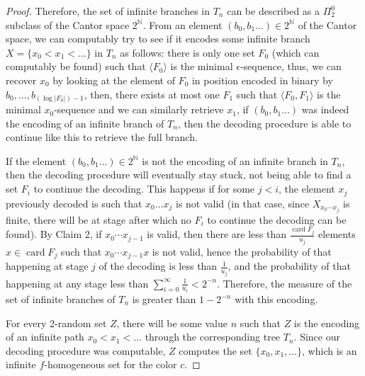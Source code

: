 \documentclass{article}
\numberwithin{theorem}{section}
\newcommand{\ludovic}[1]{\textcolor{blue}{#1}}
\newcommand{\quentin}[1]{\textcolor{green}{#1}}
\newcommand{\NN}[0]{\mathbb{N}}
\newcommand{\card}{\operatorname{card}}
\begin{document}
\begin{proof}
Therefore, the set of infinite branches in $T_n$ can be described as a $\Pi_2^0$ subclass of the Cantor space $2^{\NN}$. From an element $(b_0, b_1 \dots) \in 2^{\NN}$ of the Cantor space, we can computably try to see if it encodes some infinite branch $X = \{x_0 < x_1 < \dots \}$ in $T_n$ as follows: there is only one set $F_0$ (which can computably be found) such that $\langle F_0 \rangle$ is the minimal $\epsilon$-sequence, thus, we can recover $x_0$ by looking at the element of $F_0$ in position encoded in binary by $b_0, \dots, b_{(\log |F_0|) - 1}$, then, there exists at most one $F_1$ such that $\langle F_0, F_1\rangle$ is the minimal $x_0$-sequence and we can similarly retrieve $x_1$, if $(b_0, b_1 \dots)$ was indeed the encoding of an infinite branch of $T_n$, then the decoding procedure is able to continue like this to retrieve the full branch. 

If the element $(b_0, b_1 \dots) \in 2^{\NN}$ is not the encoding of an infinite branch in $T_n$, then the decoding procedure will eventually stay stuck, not being able to find a set $F_i$ to continue the decoding. This happens if for some $j < i$, the element $x_{j}$ previously decoded is such that $x_0 \dots x_{j}$ is not valid (in that case, since $X_{x_0 \cdots x_j}$ is finite, there will be at stage after which no $F_i$ to continue the decoding can be found). By Claim 2, if $x_0 \cdots x_{j-1}$ is valid, then there are less than $\frac{\card F_j}{u_j}$ elements $x \in \card F_j$ such that $x_0\cdots x_{j-1} x$ is not valid, hence the probability of that happening at stage $j$ of the decoding is less than $\frac{1}{u_j}$, and the probability of that happening at any stage less than $\sum_{i=0}^{\infty} \frac{1}{u_i} < 2^{-n}$. Therefore, the measure of the set of infinite branches of $T_n$ is greater than $1 - 2^{-n}$ with this encoding. %

For every 2-random set $Z$, there will be some value $n$ such that $Z$ is the encoding of an infinite path $x_0 < x_1 < \dots$ through the corresponding tree $T_n$. Since our decoding procedure was computable, $Z$ computes the set $\{x_0, x_1, \dots\}$, which is an infinite $f$-homogeneous set for the color $c$.
\end{proof}
\end{document}
